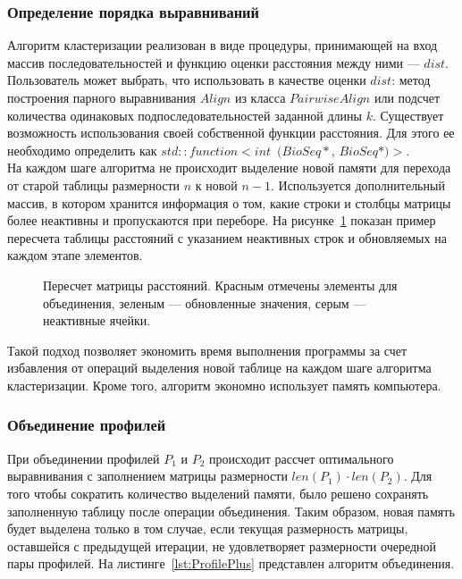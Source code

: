 \subsubsection[Определение порядка выравниваний]{\large Определение порядка выравниваний}
\hspace{\parindent} Алгоритм кластеризации реализован в виде процедуры, принимающей на вход массив последовательностей и функцию оценки расстояния между ними --- $dist$. Пользователь может выбрать, что использовать в качестве оценки $dist$: метод построения парного выравнивания $Align$ из класса $PairwiseAlign$ или подсчет количества одинаковых подпоследовательностей заданной длины $k$. Существует возможность использования своей собственной функции расстояния. Для этого ее необходимо определить как $std::function<int$~$(BioSeq*$, $BioSeq*)>$. \\
\indent На каждом шаге алгоритма не происходит выделение новой памяти для перехода от старой таблицы размерности $n$ к новой $n-1$. Используется дополнительный массив, в котором хранится информация о том, какие строки и столбцы матрицы более неактивны и пропускаются при переборе. На рисунке~\ref{ris:UPGMA-2} показан пример пересчета таблицы расстояний с указанием неактивных строк и  обновляемых на каждом этапе элементов. 

\begin{figure}[h]
	\caption{Пересчет матрицы расстояний. Красным отмечены элементы для объединения, зеленым --- обновленные значения, серым --- неактивные ячейки.}
	\label{ris:UPGMA-2}
\end{figure}

Такой подход позволяет экономить время выполнения программы за счет избавления от операций выделения новой таблице на каждом шаге алгоритма кластеризации. Кроме того, алгоритм экономно использует память компьютера.

\subsubsection[Объединение профилей]{\large Объединение профилей}
\hspace{\parindent} При объединении профилей $P_1$ и $P_2$ происходит рассчет оптимального выравнивания с заполнением матрицы размерности $len(P_1) \cdot len(P_2)$. Для того чтобы сократить количество выделений памяти, было решено сохранять заполненную таблицу после операции объединения. Таким образом, новая память будет выделена только в том случае, если текущая размерность матрицы, оставшейся с предыдущей итерации, не удовлетворяет размерности очередной пары профилей. На листинге~\ref{lst:ProfilePlus} представлен алгоритм объединения.

